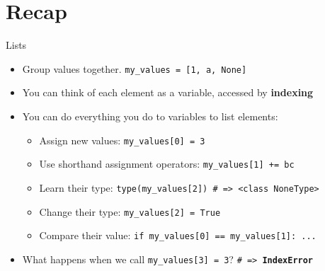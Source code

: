     \section{Recap}
        \begin{frame}{Lists}
            \begin{itemize}
                \LARGE
                \item Group values together. \texttt{my\_values = [1, \textquotesingle a\textquotesingle, None]}
                \item You can think of each element as a variable, accessed by \textbf{indexing}
                \item You can do everything you do to variables to list elements:
                    \begin{itemize}
                        \Large
                        \item Assign new values: \texttt{my\_values[0] = 3}
                        \item Use shorthand assignment operators: \texttt{my\_values[1] += \textquotesingle bc\textquotesingle}
                        \item Learn their type: \texttt{type(my\_values[2]) \# => <class \textquotesingle NoneType\textquotesingle>}
                        \item Change their type: \texttt{my\_values[2] = True}
                        \item Compare their value: \texttt{if my\_values[0] == my\_values[1]: ...}
                    \end{itemize}
                \item What happens when we call \texttt{my\_values[3] = 3}? \texttt{\# => \textbf{IndexError}}
            \end{itemize}
        \end{frame}

